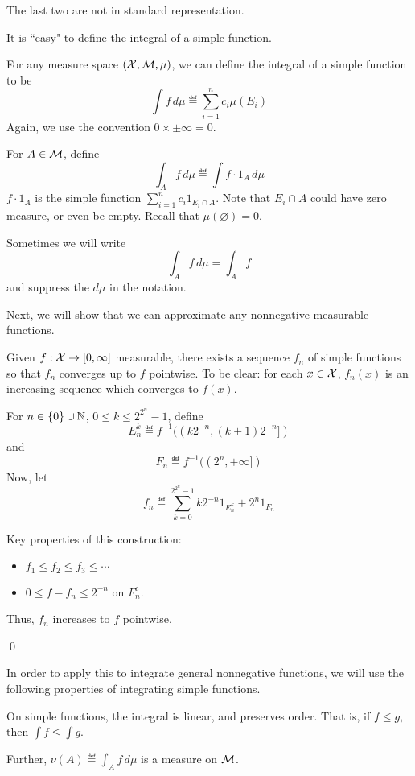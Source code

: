 \documentclass[x11names,reqno,14pt]{extarticle}
\newcommand*{\oo}{\infty}
\begin{document}
The last two are not in standard representation. 

It is ``easy" to define the integral of a simple function. 


For any measure space $(\mathcal{X}, \mathcal{M}, \mu)$, we can define the integral of a simple function to be
\[
\int f\,d\mu \eqdef \sum_{i=1}^nc_i\mu(E_i)
\]
Again, we use the convention $0\times\pm\oo = 0$. 

For $A \in \mathcal{M}$, define 
\[
\int_Af\,d\mu \eqdef \int f\cdot1_A\,d\mu
\]
$f \cdot 1_A$ is the simple function $\sum_{i=1}^nc_i1_{E_i \cap A}$. Note that $E_i \cap A$ could have zero measure, or even be empty. Recall that $\mu(\varnothing) = 0$. 

\rem 

Sometimes we will write
\[
\int_Af\,d\mu = \int_Af
\]
and suppress the $d\mu$ in the notation. 

Next, we will show that we can approximate any nonnegative measurable functions. 

\thm Given $f:\mc{X}\to[0,\oo]$ measurable, there exists a sequence $f_n$ of simple functions so that $f_n$ converges up to $f$ pointwise. To be clear: for each $x \in \mathcal{X}$, $f_n(x)$ is an increasing sequence which converges to $f(x)$. 

\proof

For $n \in \{0\} \cup \mathbb{N}$, $0 \leq k \leq 2^{2^n} - 1$, define
\[
E_n^k \eqdef f^{-1}((k2^{-n}, (k + 1)2^{-n}])
\]
and
\[
F_n \eqdef f^{-1}((2^n, +\oo])
\]
Now, let
\[
f_n \eqdef \sum_{k=0}^{2^{2^n} - 1}k2^{-n}1_{E_n^k} + 2^n1_{F_n}
\]

Key properties of this construction:
\begin{itemize}
\item $f_1 \leq f_2 \leq f_3 \leq \cdots$
\item $0 \leq f - f_n\leq2^{-n}$ on $F_n^c$. 
\end{itemize}

Thus, $f_n$ increases to $f$ pointwise. 

\qed

In order to apply this to integrate general nonnegative functions,  we will use the following properties of integrating simple functions. 

\prop

On simple functions, the integral is linear, and preserves order. That is, if $f \leq g$, then $\int f \leq \int g$. 

Further, $\nu(A) \eqdef \int_Af\,d\mu$ is a measure on $\mathcal{M}$. 
\end{document}
